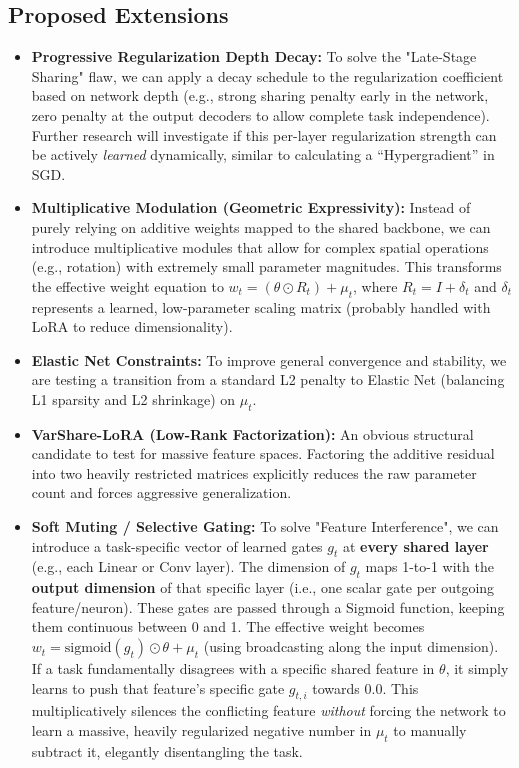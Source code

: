 \documentclass[11pt,a4paper]{article}
\begin{document}
\subsection*{Proposed Extensions}
\begin{itemize}
    \item \textbf{Progressive Regularization Depth Decay:} To solve the "Late-Stage Sharing" flaw, we can apply a decay schedule to the regularization coefficient based on network depth (e.g., strong sharing penalty early in the network, zero penalty at the output decoders to allow complete task independence). Further research will investigate if this per-layer regularization strength can be actively \textit{learned} dynamically, similar to calculating a ``Hypergradient'' in SGD.
    \item \textbf{Multiplicative Modulation (Geometric Expressivity):} Instead of purely relying on additive weights mapped to the shared backbone, we can introduce multiplicative modules that allow for complex spatial operations (e.g., rotation) with extremely small parameter magnitudes. This transforms the effective weight equation to $w_t = (\theta \odot R_t) + \mu_t$, where $R_t = I + \delta_t$ and $\delta_t$ represents a learned, low-parameter scaling matrix (probably handled with LoRA to reduce dimensionality).
    \item \textbf{Elastic Net Constraints:} To improve general convergence and stability, we are testing a transition from a standard L2 penalty to Elastic Net (balancing L1 sparsity and L2 shrinkage) on $\mu_t$.
    \item \textbf{VarShare-LoRA (Low-Rank Factorization):} An obvious structural candidate to test for massive feature spaces. Factoring the additive residual into two heavily restricted matrices explicitly reduces the raw parameter count and forces aggressive generalization.
    \item \textbf{Soft Muting / Selective Gating:} To solve "Feature Interference", we can introduce a task-specific vector of learned gates $g_t$ at \textbf{every shared layer} (e.g., each Linear or Conv layer). The dimension of $g_t$ maps 1-to-1 with the \textbf{output dimension} of that specific layer (i.e., one scalar gate per outgoing feature/neuron). These gates are passed through a Sigmoid function, keeping them continuous between 0 and 1. The effective weight becomes $w_t = \text{sigmoid}(g_t) \odot \theta + \mu_t$ (using broadcasting along the input dimension). If a task fundamentally disagrees with a specific shared feature in $\theta$, it simply learns to push that feature's specific gate $g_{t,i}$ towards $0.0$. This multiplicatively silences the conflicting feature \textit{without} forcing the network to learn a massive, heavily regularized negative number in $\mu_t$ to manually subtract it, elegantly disentangling the task.
\end{itemize}
\end{document}
